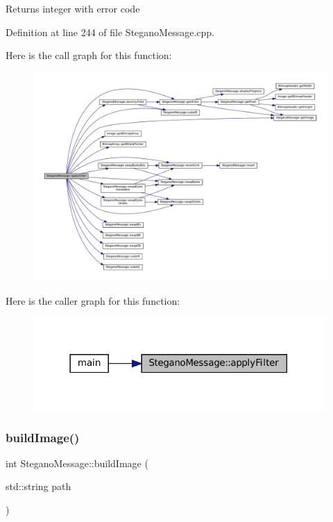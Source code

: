 \begin{DoxyReturn}{Returns}
integer with error code 
\end{DoxyReturn}


Definition at line 244 of file Stegano\+Message.\+cpp.

Here is the call graph for this function\+:
\nopagebreak
\begin{figure}[H]
\begin{center}
\leavevmode
\includegraphics[width=350pt]{classSteganoMessage_aec575d6949cf2eb49adefe2f1299d075_cgraph}
\end{center}
\end{figure}
Here is the caller graph for this function\+:
\nopagebreak
\begin{figure}[H]
\begin{center}
\leavevmode
\includegraphics[width=314pt]{classSteganoMessage_aec575d6949cf2eb49adefe2f1299d075_icgraph}
\end{center}
\end{figure}
\mbox{\label{classSteganoMessage_ad90a4cf8cf03febfb4c3df955ccab13d}} 
\subsubsection{\texorpdfstring{buildImage()}{buildImage()}}
{\footnotesize\ttfamily int Stegano\+Message\+::build\+Image (\begin{DoxyParamCaption}\item[{std\+::string}]{path }\end{DoxyParamCaption})}



